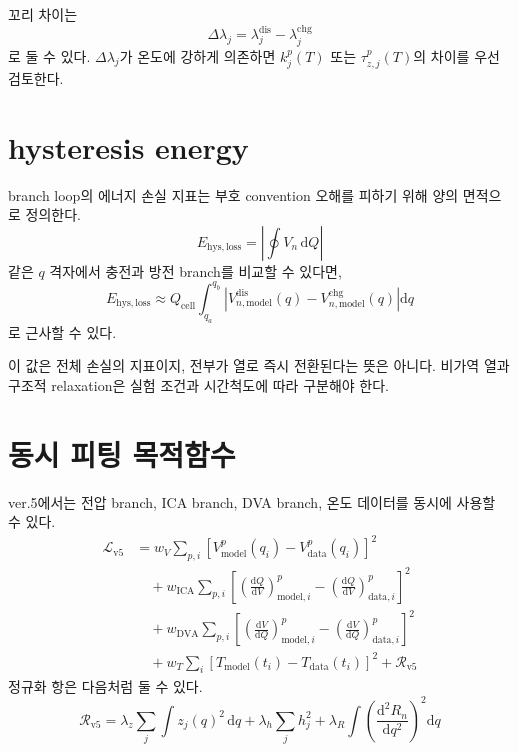 \documentclass[11pt,a4paper]{article}
\newcommand{\dd}{\mathrm{d}}
\newcommand{\cell}{\mathrm{cell}}
\newcommand{\dis}{\mathrm{dis}}
\newcommand{\chg}{\mathrm{chg}}
\begin{document}
꼬리 차이는
\begin{equation}
\Delta\lambda_j=\lambda_j^{\dis}-\lambda_j^{\chg}
\end{equation}
로 둘 수 있다. \(\Delta\lambda_j\)가 온도에 강하게 의존하면 \(k_j^p(T)\) 또는 \(\tau_{z,j}^p(T)\)의 차이를 우선 검토한다.

\section{hysteresis energy}
branch loop의 에너지 손실 지표는 부호 convention 오해를 피하기 위해 양의 면적으로 정의한다.
\begin{equation}
E_{\mathrm{hys,loss}}
=
\left|\oint V_n\,\dd Q\right|
\label{eq:v5_loop_energy}
\end{equation}
같은 \(q\) 격자에서 충전과 방전 branch를 비교할 수 있다면,
\begin{equation}
E_{\mathrm{hys,loss}}
\approx
Q_{\cell}
\int_{q_a}^{q_b}
\left|
V_{n,\mathrm{model}}^{\dis}(q)-V_{n,\mathrm{model}}^{\chg}(q)
\right|\dd q
\end{equation}
로 근사할 수 있다.

이 값은 전체 손실의 지표이지, 전부가 열로 즉시 전환된다는 뜻은 아니다. 비가역 열과 구조적 relaxation은 실험 조건과 시간척도에 따라 구분해야 한다.

\section{동시 피팅 목적함수}
ver.5에서는 전압 branch, ICA branch, DVA branch, 온도 데이터를 동시에 사용할 수 있다.
\begin{align}
\mathcal L_{\mathrm{v5}}
&=
w_V\sum_{p,i}\left[V_{\mathrm{model}}^{p}(q_i)-V_{\mathrm{data}}^{p}(q_i)\right]^2\\
&\quad+
w_{\mathrm{ICA}}\sum_{p,i}\left[
\left(\frac{\dd Q}{\dd V}\right)_{\mathrm{model},i}^{p}
-
\left(\frac{\dd Q}{\dd V}\right)_{\mathrm{data},i}^{p}
\right]^2\\
&\quad+
w_{\mathrm{DVA}}\sum_{p,i}\left[
\left(\frac{\dd V}{\dd Q}\right)_{\mathrm{model},i}^{p}
-
\left(\frac{\dd V}{\dd Q}\right)_{\mathrm{data},i}^{p}
\right]^2\\
&\quad+
w_T\sum_i\left[T_{\mathrm{model}}(t_i)-T_{\mathrm{data}}(t_i)\right]^2
+
\mathcal R_{\mathrm{v5}}
\end{align}
정규화 항은 다음처럼 둘 수 있다.
\begin{equation}
\mathcal R_{\mathrm{v5}}
=
\lambda_z\sum_j\int z_j(q)^2\,\dd q
+
\lambda_h\sum_jh_j^2
+
\lambda_R\int\left(\frac{\dd^2R_n}{\dd q^2}\right)^2\dd q
\end{equation}
\end{document}

